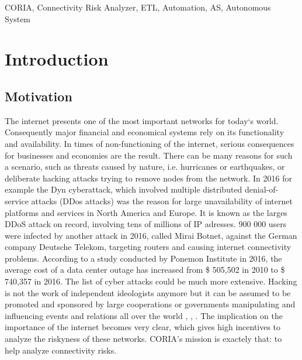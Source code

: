 \documentclass[conference, 11pt]{IEEEtran}
\begin{document}
\begin{IEEEkeywords}
CORIA, Connectivity Risk Analyzer, ETL, Automation, AS, Autonomous System
\end{IEEEkeywords}


\section{Introduction}
\subsection{Motivation}
The internet presents one of the most important networks for today‘s world. Consequently major financial and economical systems rely on its functionality and availability. In times of non-functioning of the internet, serious consequences for businesses and economies are the result. There can be many reasons for such a scenario, such as threats caused by nature, i.e. hurricanes or earthquakes, or deliberate hacking attacks trying to remove nodes from the network.  
In 2016 for example the Dyn cyberattack, which involved multiple distributed denial-of-service attacks (DDos attacks) was the reason for large unavailability of internet platforms and services in North America and Europe. It is known as the larges DDoS attack on record, involving tens of millions of IP adresses\cite{dyn}. 900 000 users were infected by another attack in 2016, called Mirai Botnet, against the German company Deutsche Telekom, targeting routers and causing internet connectivity problems. \cite{DT}According to a study conducted by Ponemon Institute in 2016, the average cost of a data center outage has increased from \$ 505,502 in 2010 to \$ 740,357 in 2016\cite{Ponemon}. The list of cyber attacks could be much more extensive. Hacking is not the work of independent ideologists anymore but it can be assumed to be promoted and sponsored by large cooperations or governments manipulating and influencing events and relations all over the world \cite{cyberSponsors}, \cite{cyberSponsors2}, \cite{cyberSponsors3}. The implication on the importance of the internet becomes very clear, which gives high incentives to analyze the riskyness of these networks. CORIA's mission is exactely that: to help analyze connectivity risks\cite{Coria}.
\end{document}
